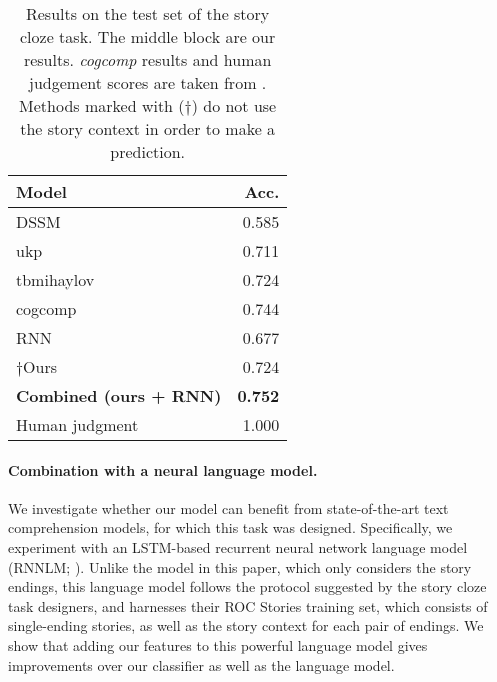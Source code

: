 \documentclass[11pt,a4paper]{article}
\newcommand{\com}[1]{}
\newcommand{\resolved}[1]{}
\newcommand{\yc}[1]{{\color{bblue}\{\textit{#1}\}$_{yc}$}}
\newcommand{\nascomment}[1]{{\color{blue}\textsc{[#1 --nas]}}}
\renewcommand{\nascomment}[1]{}
\renewcommand{\yc}[1]{}
\begin{document}
\begin{table}[!t]
\begin{center}
\begin{tabular}{|l|r|} \hline
{\bf Model} & {\bf Acc.} \\ \hline
{DSSM} \cite{Mostafazadeh:2016} & 0.585 \\ 
{ukp} \cite{Mihaylov:2017} & 0.711\\ 
{tbmihaylov} \cite{Mihaylov:2017} & 0.724\\ 
{cogcomp}  & 0.744 \\ \hline\hline
{RNN}		& 0.677 \\ 
$\dagger${Ours} & {0.724} \\ 
{\bf Combined (ours + RNN)} & {\bf 0.752} \\ \hline\hline
Human judgment & 1.000 \\ \hline
\end{tabular}
\end{center}
\caption{\label{cloze_results}\resolved{\yc{we should change accuracy to be in 0-100\% scale to be consistent with Table 2}}Results on the test set of the  story cloze task.\com{
The upper block shows published results, }
The middle block are our results.
{\it cogcomp} results and human judgement scores are taken from \cite{Mostafazadeh:2017}.
Methods marked with ($\dagger$) do not use the story context in order to make a prediction. 
 \resolved{\nascomment{I added 0s to ``Niko'' result
  and ``human''
  so sig. digits would line up.  if we don't have sig digits for some
  of them, make the zeros white so the numbers line up.  where did the
human judgments come from?  those are not mentioned in our text anywhere!}
}}
\end{table}


\paragraph{Combination with a neural language model.}
We investigate whether our model can benefit from state-of-the-art text comprehension models, for which this task was designed. 
Specifically, we experiment with an LSTM-based \cite{hochreiter1997long} recurrent neural network language model (RNNLM; \citealp{mikolov2010recurrent}). %
Unlike the model in this paper, which only considers the story endings, this language model follows the protocol suggested by the story cloze task designers, and harnesses their ROC Stories training set, which consists of single-ending stories, 
as well as the story context for each pair of endings. 
We show that adding our features to this powerful language model
gives improvements over our classifier as well as the language
model.  \resolved{\nascomment{reworded.  more important that our features help
  the language model, than the other way around!}}
\end{document}
